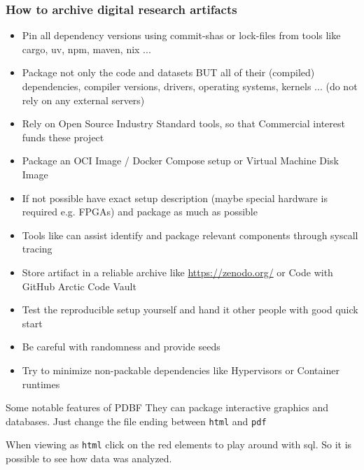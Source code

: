 \documentclass[aspectratio=169]{beamer}
\begin{document}
\begin{frame}[allowframebreaks]
\frametitle{How to archive digital research artifacts}
    \begin{itemize}
        \item Pin all dependency versions using commit-shas or lock-files from tools like cargo, uv, npm, maven, nix ...
        \item Package not only the code and datasets BUT all of their (compiled) dependencies, compiler versions, drivers, operating systems, kernels ... (do not rely on any external servers)
        \item Rely on Open Source Industry Standard tools, so that Commercial interest funds these project
        \item Package an OCI Image / Docker Compose setup or Virtual Machine Disk Image
        \item If not possible have exact setup description (maybe special hardware is required e.g. FPGAs) and package as much as possible
        \item Tools like  can assist identify and package relevant components through syscall tracing
        \item Store artifact in a reliable archive like \url{https://zenodo.org/} or Code with GitHub Arctic Code Vault
        \item Test the reproducible setup yourself and hand it other people with good quick start
        \item Be careful with randomness and provide seeds
        \item Try to minimize non-packable dependencies like Hypervisors or Container runtimes
    \end{itemize}
\end{frame}


\begin{frame}{Some notable features of PDBF}
    They can package interactive graphics and databases. Just change the file ending between \texttt{html} and \texttt{pdf}

    When viewing as \texttt{html} click on the red elements to play around with sql.
    So it is possible to see how data was analyzed.

\end{frame}
\end{document}
